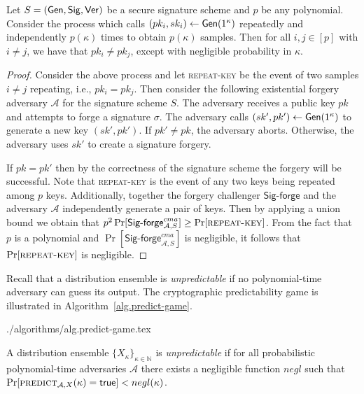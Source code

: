 \begin{lemma}\label{lem:distinct-keys}
  Let $S = (\mathsf{Gen}, \mathsf{Sig}, \mathsf{Ver})$ be a secure signature scheme and $p$ be any polynomial. Consider the process which calls $(pk_i, sk_i) \gets \mathsf{Gen}(1^\kappa)$ repeatedly and independently $p(\kappa)$ times to obtain $p(\kappa)$ samples. Then for all $i, j \in [p]$ with $i \neq j$, we have that $pk_i \neq pk_j$, except with negligible probability in $\kappa$.
\end{lemma}
\begin{proof}
  Consider the above process and let \textsc{repeat-key} be the event of two samples $i \neq j$ repeating, i.e., $pk_i = pk_j$. Then consider the following existential forgery adversary $\mathcal{A}$ for the signature scheme $S$. The adversary receives a public key $pk$ and attempts to forge a signature $\sigma$. The adversary calls $(sk', pk') \gets \mathsf{Gen}(1^\kappa)$ to generate a new key $(sk', pk')$. If $pk' \neq pk$, the adversary aborts. Otherwise, the adversary uses $sk'$ to create a signature forgery.

  If $pk = pk'$ then by the correctness of the signature scheme the forgery will be successful. Note that \textsc{repeat-key} is the event of any two keys being repeated among $p$ keys. Additionally, together the forgery challenger $\textsf{Sig-forge}$ and the adversary $\mathcal{A}$ independently generate a pair of keys. Then by applying a union bound we obtain that $p^2 \Pr[\textsf{Sig-forge}^{cma}_{\mathcal{A},S}] \geq \Pr[\textsc{repeat-key}]$. From the fact that $p$ is a polynomial and
  $\Pr[\textsf{Sig-forge}^{cma}_{\mathcal{A},S}]$ is negligible, it follows that $\Pr[\textsc{repeat-key}]$ is negligible.
\end{proof}

Recall that a distribution ensemble is \emph{unpredictable} if no
polynomial-time adversary can guess its output. The cryptographic
predictability game is illustrated in Algorithm~\ref{alg.predict-game}.

{./algorithms/alg.predict-game.tex}

\begin{definition}
  A distribution ensemble $\{X_{\kappa}\}_{\kappa\in\mathbb{N}}$ is
  \emph{unpredictable} if for all probabilistic polynomial-time adversaries
  $\mathcal{A}$ there exists a negligible function $negl$ such that
  $\Pr[\textsc{predict}_{\mathcal{A},X}(\kappa) = \mathsf{true}] < negl(\kappa)$.
\end{definition}

